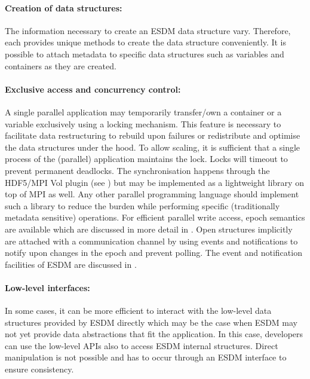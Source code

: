 \paragraph{Creation of data structures:}
The information necessary to create an ESDM data structure vary. Therefore, each provides unique methods to create the data structure conveniently.
It is possible to attach metadata to specific data structures such as variables and containers as they are created.


\paragraph{Exclusive access and concurrency control:}
A single parallel application may temporarily transfer/own a container or a variable exclusively using a locking mechanism.
This feature is necessary to facilitate data restructuring to rebuild upon failures or redistribute and optimise the data structures under the hood.
To allow scaling, it is sufficient that a single process of the (parallel) application maintains the lock.
Locks will timeout to prevent permanent deadlocks.
The synchronisation happens through the HDF5/MPI Vol plugin (see ) but may be implemented as a lightweight library on top of MPI as well.
Any other parallel programming language should implement such a library to reduce the burden while performing specific (traditionally metadata sensitive) operations.
For efficient parallel write access, epoch semantics are available which are discussed in more detail in .
Open structures implicitly are attached with a communication channel by using events and notifications to notify upon changes in the epoch and prevent polling.
The event and notification facilities of ESDM are discussed in .


\paragraph{ Low-level interfaces:}
In some cases, it can be more efficient to interact with the low-level data structures provided by ESDM directly which may be the case when ESDM may not yet provide data abstractions that fit the application.
In this case, developers can use the low-level APIs also to access ESDM internal structures.
Direct manipulation is not possible and has to occur through an ESDM interface to ensure consistency.






